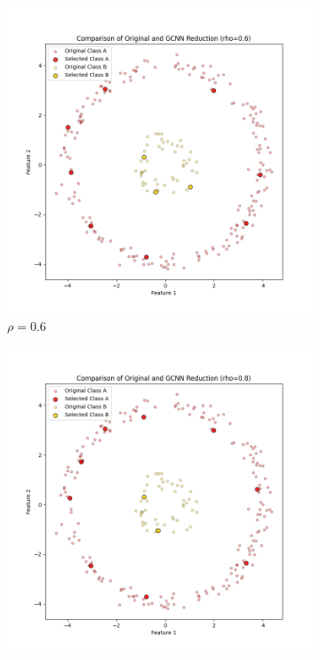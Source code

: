 \begin{figure}[htbp]
	\centering
	\begin{subfigure}[b]{0.3\textwidth}
		\centering
		\includegraphics[width=\textwidth]{figures/gcnn/comparison_plot_rho_0.6.png}
		\caption{$\rho = 0.6$}
		\label{fig:rho0.6}
	\end{subfigure}
	\hfill
	\begin{subfigure}[b]{0.3\textwidth}
		\centering
		\includegraphics[width=\textwidth]{figures/gcnn/comparison_plot_rho_0.8.png}

\end{subfigure}
\end{figure}

